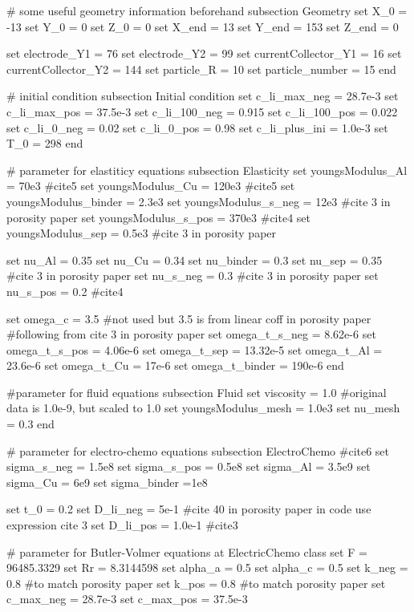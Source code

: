 \begin{DoxyCode}
\textcolor{preprocessor}{# some useful geometry information beforehand}
\textcolor{preprocessor}{}subsection Geometry
set X\_0 = -13
set Y\_0 = 0
set Z\_0 = 0
set X\_end = 13 
set Y\_end = 153
set Z\_end = 0

set electrode\_Y1 = 76
set electrode\_Y2 = 99
set currentCollector\_Y1 = 16
set currentCollector\_Y2 = 144
set particle\_R = 10
set particle\_number = 15
end

\textcolor{preprocessor}{# initial condition}
\textcolor{preprocessor}{}subsection Initial condition
set c\_li\_max\_neg = 28.7e-3
set c\_li\_max\_pos = 37.5e-3
set c\_li\_100\_neg = 0.915
set c\_li\_100\_pos = 0.022
set c\_li\_0\_neg = 0.02
set c\_li\_0\_pos = 0.98
set c\_li\_plus\_ini = 1.0e-3
set T\_0 = 298
end

\textcolor{preprocessor}{# parameter for elastiticy equations}
\textcolor{preprocessor}{}subsection Elasticity
set youngsModulus\_Al = 70e3 #cite5
set youngsModulus\_Cu = 120e3 #cite5 
set youngsModulus\_binder = 2.3e3
set youngsModulus\_s\_neg = 12e3 #cite 3 in porosity paper
set youngsModulus\_s\_pos = 370e3 #cite4
set youngsModulus\_sep = 0.5e3 #cite 3 in porosity paper

set nu\_Al = 0.35
set nu\_Cu = 0.34
set nu\_binder = 0.3 
set nu\_sep = 0.35 #cite 3 in porosity paper
set nu\_s\_neg = 0.3 #cite 3 in porosity paper
set nu\_s\_pos = 0.2 #cite4 

set omega\_c = 3.5 #not used but 3.5 is from linear coff in porosity paper
\textcolor{preprocessor}{#following from cite 3 in porosity paper}
\textcolor{preprocessor}{}set omega\_t\_s\_neg = 8.62e-6 
set omega\_t\_s\_pos = 4.06e-6
set omega\_t\_sep = 13.32e-5
set omega\_t\_Al = 23.6e-6
set omega\_t\_Cu = 17e-6
set omega\_t\_binder = 190e-6 
end

\textcolor{preprocessor}{#parameter for fluid equations}
\textcolor{preprocessor}{}subsection Fluid
set viscosity = 1.0 #original data is 1.0e-9, but scaled to 1.0
set youngsModulus\_mesh = 1.0e3
set nu\_mesh = 0.3
end

\textcolor{preprocessor}{# parameter for electro-chemo equations}
\textcolor{preprocessor}{}subsection ElectroChemo #cite6
set sigma\_s\_neg = 1.5e8
set sigma\_s\_pos = 0.5e8
set sigma\_Al = 3.5e9
set sigma\_Cu = 6e9
set sigma\_binder =1e8

set t\_0 = 0.2
set D\_li\_neg = 5e-1 #cite 40 in porosity paper in code use expression cite 3 
set D\_li\_pos = 1.0e-1 #cite3

\textcolor{preprocessor}{# parameter for Butler-Volmer equations at ElectricChemo class}
\textcolor{preprocessor}{}set F = 96485.3329
set Rr = 8.3144598
set alpha\_a = 0.5
set alpha\_c = 0.5
set k\_neg = 0.8 #to match porosity paper
set k\_pos = 0.8 #to match porosity paper
set c\_max\_neg = 28.7e-3
set c\_max\_pos = 37.5e-3


\end{DoxyCode}

